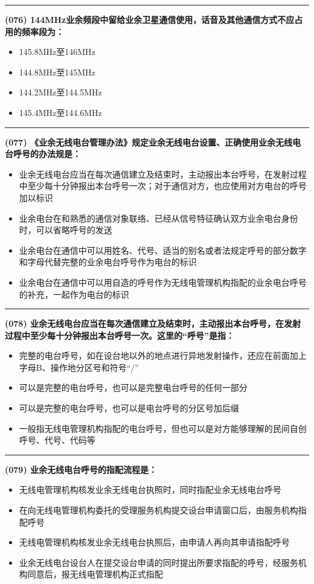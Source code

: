\documentclass[twocolumn]{ctexart}  %
\begin{document}
\noindent\rule{0.5\textwidth}{1pt}
\heiti \textbf{(076) 144MHz业余频段中留给业余卫星通信使用，话音及其他通信方式不应占用的频率段为：} \songti {\color{gray} [LK1032] }
\begin{itemize}
	\item  145.8MHz至146MHz
	\item  144.8MHz至145MHz
	\item  144.2MHz至144.5MHz
	\item  145.4MHz至144.6MHz
\end{itemize}


\noindent\rule{0.5\textwidth}{1pt}
\heiti \textbf{(077) 《业余无线电台管理办法》规定业余无线电台设置、正确使用业余无线电台呼号的办法规是：} \songti {\color{gray} [LK0077] }
\begin{itemize}
	\item  业余无线电台应当在每次通信建立及结束时，主动报出本台呼号，在发射过程中至少每十分钟报出本台呼号一次；对于通信对方，也应使用对方电台的呼号加以标识
	\item  业余电台在和熟悉的通信对象联络、已经从信号特征确认双方业余电台身份时，可以省略呼号的发送
	\item  业余电台在通信中可以用姓名、代号、适当的别名或者法规定呼号的部分数字和字母代替完整的业余电台呼号作为电台的标识
	\item  业余电台在通信中可以用自造的呼号作为无线电管理机构指配的业余电台呼号的补充，一起作为电台的标识
\end{itemize}


\noindent\rule{0.5\textwidth}{1pt}
\heiti \textbf{(078) 业余无线电台应当在每次通信建立及结束时，主动报出本台呼号，在发射过程中至少每十分钟报出本台呼号一次。这里的“呼号”是指：} \songti {\color{gray} [LK0078] }
\begin{itemize}
	\item  完整的电台呼号，如在设台地以外的地点进行异地发射操作，还应在前面加上字母B、操作地分区号和符号“/”
	\item  可以是完整的电台呼号，也可以是完整电台呼号的任何一部分
	\item  可以是完整的电台呼号，也可以是电台呼号的分区号加后缀
	\item  一般指无线电管理机构指配的电台呼号，但也可以是对方能够理解的民间自创呼号、代号、代码等
\end{itemize}


\noindent\rule{0.5\textwidth}{1pt}
\heiti \textbf{(079) 业余无线电台呼号的指配流程是：} \songti {\color{gray} [LK0080] }
\begin{itemize}
	\item  无线电管理机构核发业余无线电台执照时，同时指配业余无线电台呼号
	\item  在向无线电管理机构委托的受理服务机构提交设台申请窗口后，由服务机构指配呼号
	\item  无线电管理机构核发业余无线电台执照后，由申请人再向其申请指配呼号
	\item  业余无线电台设台人在提交设台申请的同时提出所要求指配的呼号，经服务机构同意后，报无线电管理机构正式指配
\end{itemize}
\end{document}
